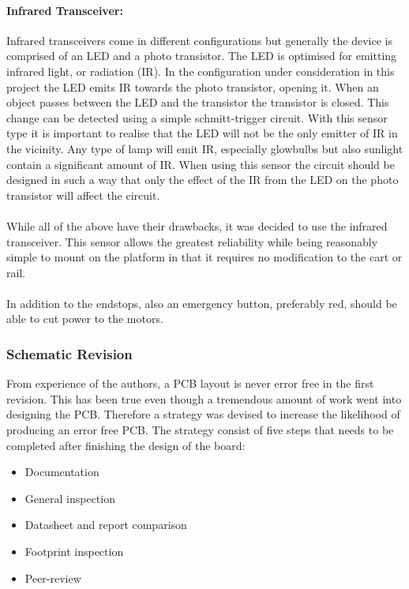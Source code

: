 \paragraph{Infrared Transceiver:} %
\label{par:infrared_transceiver}
Infrared transceivers come in different configurations but generally the device is comprised of an LED and a photo transistor.
The LED is optimised for emitting infrared light, or radiation (IR).
In the configuration under consideration in this project the LED emits IR towards the photo transistor, opening it.
When an object passes between the LED and the transistor the transistor is closed.
This change can be detected using a simple schmitt-trigger circuit. 
With this sensor type it is important to realise that the LED will not be the only emitter of IR in the vicinity.
Any type of lamp will emit IR, especially glowbulbs but also sunlight contain a significant amount of IR.
When using this sensor the circuit should be designed in such a way that only the effect of the IR from the LED on the photo transistor will affect the circuit.
\\~\\
While all of the above have their drawbacks, it was decided to use the infrared transceiver.
This sensor allows the greatest reliability while being reasonably simple to mount on the platform in that it requires no modification to the cart or rail.
\\~\\
In addition to the endstops, also an emergency button, preferably red, should be able to cut power to the motors.

\subsubsection{Schematic Revision} %
\label{ssub:schematic_revision}

From experience of the authors, a PCB layout is never error free in the first revision. 
This has been true even though a tremendous amount of work went into designing the PCB.
Therefore a strategy was devised to increase the likelihood of producing an error free PCB.
The strategy consist of five steps that needs to be completed after finishing the design of the board:

\begin{itemize}
	\item Documentation
	\item General inspection
	\item Datasheet and report comparison
	\item Footprint inspection 
	\item Peer-review
\end{itemize}

